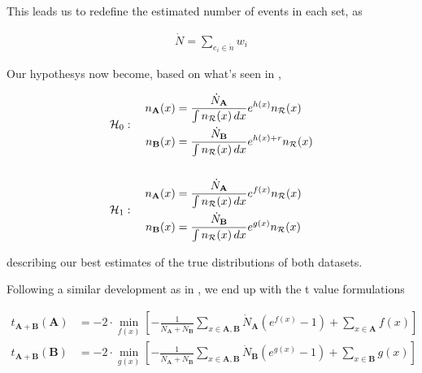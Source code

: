 \documentclass{article}
\begin{document}
This leads us to redefine the estimated number of events in each set, as

$$
\begin{aligned}
\dot{N} = \sum\limits_{e_i \in \dot{n}} w_i
\end{aligned}
$$

Our hypothesys now become, based on what's seen in \cite{LastDDPPaper},

$$
\begin{aligned}
    \mathcal{H}_{0} &: \quad
    \begin{aligned}
        n_{\mathbf{A}}(x) &= \dfrac{\dot{N}_{\mathbf{A}}}{\int n_{\mathcal{R}}(x)\, dx} e^{h(x)} n_{\mathcal{R}}(x) \\
        n_{\mathbf{B}}(x) &= \dfrac{\dot{N}_{\mathbf{B}}}{\int n_{\mathcal{R}}(x)\, dx} e^{h(x) + r} n_{\mathcal{R}}(x)        
    \end{aligned}
    \\\vspace{1em}\\
    \mathcal{H}_{1} &: \quad
    \begin{aligned}
        n_{\mathbf{A}}(x) &= \dfrac{\dot{N}_{\mathbf{A}}}{\int n_{\mathcal{R}}(x)\, dx} e^{f(x)} n_{\mathcal{R}}(x) \\
        n_{\mathbf{B}}(x) &= \dfrac{\dot{N}_{\mathbf{B}}}{\int n_{\mathcal{R}}(x)\, dx} e^{g(x)} n_{\mathcal{R}}(x)
    \end{aligned}
\end{aligned}
$$

describing our best estimates of the true distributions of both datasets.

Following a similar development as in \cite{LastDDPPaper}, we end up with the t value formulations

$$
\begin{aligned}
    t_{\mathbf{A}+\mathbf{B}}(\mathbf{A}) &= -2 \cdot \min_{f(x)}
    \left[
        - \frac{1}{\dot{N}_{\mathbf{A}} + \dot{N}_{\mathbf{B}}}
        \sum_{x \in \mathbf{A}, \mathbf{B}} \dot{N}_{\mathbf{A}} \left( e^{f(x)} - 1 \right)
        + \sum_{x \in \mathbf{A}} f(x)
    \right]
    \\
    t_{\mathbf{A}+\mathbf{B}}(\mathbf{B}) &= -2 \cdot \min_{g(x)}
    \left[
        - \frac{1}{\dot{N}_{\mathbf{A}} + \dot{N}_{\mathbf{B}}}
        \sum_{x \in \mathbf{A}, \mathbf{B}} \dot{N}_{\mathbf{B}} \left( e^{g(x)} - 1 \right)
        + \sum_{x \in \mathbf{B}} g(x)
    \right]
\end{aligned}
$$
\end{document}

